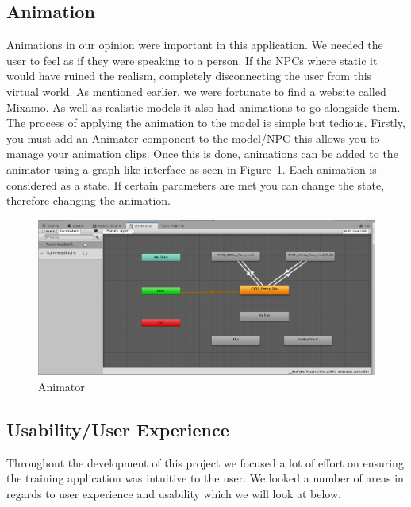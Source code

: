 \subsection{Animation}
Animations in our opinion were important in this application. We needed the user to feel as if they were speaking to a person. If the NPCs where static it would have ruined the realism, completely disconnecting the user from this virtual world. As mentioned earlier, we were fortunate to find a website called Mixamo. As well as realistic models it also had animations to go alongside them. The process of applying the animation to the model is simple but tedious. Firstly, you must add an Animator component to the model/NPC this allows you to manage your animation clips. Once this is done, animations can be added to the animator using a graph-like interface as seen in Figure~\ref{fig:anim}. Each animation is considered as a state. If certain parameters are met you can change the state, therefore changing the animation.

\begin{figure}[!ht]
    \centering
    \includegraphics[width=1\textwidth]{Images/animator.PNG}
    \caption{Animator}
    \label{fig:anim}
\end{figure}

\subsection{Usability/User Experience}
Throughout the development of this project we focused a lot of effort on ensuring the training application was intuitive to the user. We looked a number of areas in regards to user experience and usability which we will look at below.

